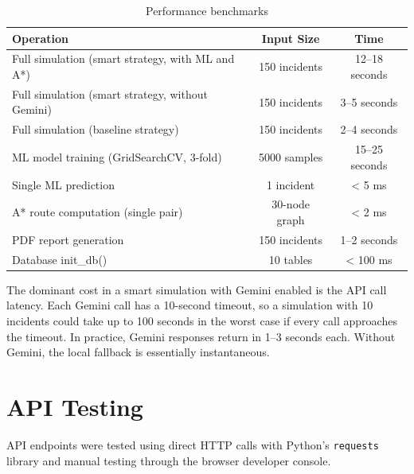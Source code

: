 \begin{table}[H]
\centering
\caption{Performance benchmarks}
\label{tab:performance}
\begin{tabularx}{\textwidth}{|X|c|c|}
\hline
\textbf{Operation} & \textbf{Input Size} & \textbf{Time} \\
\hline
Full simulation (smart strategy, with ML and A*) & 150 incidents & 12--18 seconds \\
\hline
Full simulation (smart strategy, without Gemini) & 150 incidents & 3--5 seconds \\
\hline
Full simulation (baseline strategy) & 150 incidents & 2--4 seconds \\
\hline
ML model training (GridSearchCV, 3-fold) & 5000 samples & 15--25 seconds \\
\hline
Single ML prediction & 1 incident & < 5 ms \\
\hline
A* route computation (single pair) & 30-node graph & < 2 ms \\
\hline
PDF report generation & 150 incidents & 1--2 seconds \\
\hline
Database init\_db() & 10 tables & < 100 ms \\
\hline
\end{tabularx}
\end{table}

The dominant cost in a smart simulation with Gemini enabled is the API call latency. Each Gemini call has a 10-second timeout, so a simulation with 10 incidents could take up to 100 seconds in the worst case if every call approaches the timeout. In practice, Gemini responses return in 1--3 seconds each. Without Gemini, the local fallback is essentially instantaneous.

\section{API Testing}
\label{sec:api_testing}

API endpoints were tested using direct HTTP calls with Python's \texttt{requests} library and manual testing through the browser developer console.

